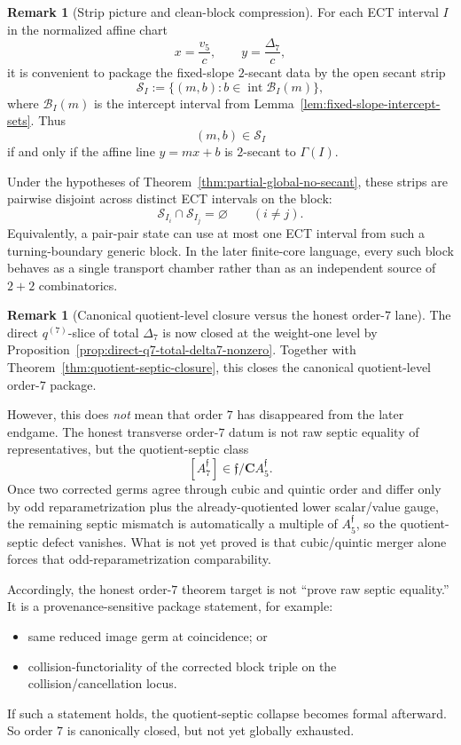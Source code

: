\documentclass[11pt,a4paper]{amsart}
\theoremstyle{plain}
\theoremstyle{definition}
\newtheorem{remark}[theorem]{Remark}
\begin{document}
\begin{remark}[Strip picture and clean-block compression]
\label{rem:strip-picture-clean-block-compression}
For each ECT interval $I$ in the normalized affine chart
\[
x=\frac{v_5}{c},
\qquad
y=\frac{\Delta_7}{c},
\]
it is convenient to package the fixed-slope $2$-secant data by the open
secant strip
\[
\mathcal S_I
:=
\{(m,b): b\in \operatorname{int}\mathcal B_I(m)\},
\]
where $\mathcal B_I(m)$ is the intercept interval from
Lemma~\ref{lem:fixed-slope-intercept-sets}. Thus
\[
(m,b)\in \mathcal S_I
\]
if and only if the affine line $y=mx+b$ is $2$-secant to $\Gamma(I)$.

Under the hypotheses of
Theorem~\ref{thm:partial-global-no-secant}, these strips are pairwise disjoint
across distinct ECT intervals on the block:
\[
\mathcal S_{I_i}\cap \mathcal S_{I_j}=\varnothing
\qquad(i\neq j).
\]
Equivalently, a pair-pair state can use at most one ECT interval from such a
turning-boundary generic block. In the later finite-core language, every such
block behaves as a single transport chamber rather than as an independent
source of $2+2$ combinatorics.
\end{remark}

\begin{remark}[Canonical quotient-level closure versus the honest order-$7$ lane]
\label{rem:status-direct-septic-witness}
The direct $q^{(7)}$-slice of total $\Delta_7$ is now closed at the
weight-one level by
Proposition~\ref{prop:direct-q7-total-delta7-nonzero}. Together with
Theorem~\ref{thm:quotient-septic-closure}, this closes the canonical
quotient-level order-$7$ package.

However, this does \emph{not} mean that order $7$ has disappeared from the
later endgame. The honest transverse order-$7$ datum is not raw septic
equality of representatives, but the quotient-septic class
\[
[A_7^{\mathfrak f}]\in \mathfrak f/\mathbf C A_5^{\mathfrak f}.
\]
Once two corrected germs agree through cubic and quintic order and differ only
by odd reparametrization plus the already-quotiented lower scalar/value gauge,
the remaining septic mismatch is automatically a multiple of
$A_5^{\mathfrak f}$, so the quotient-septic defect vanishes. What is not yet
proved is that cubic/quintic merger alone forces that odd-reparametrization
comparability.

Accordingly, the honest order-$7$ theorem target is not ``prove raw septic
equality.'' It is a provenance-sensitive package statement, for example:
\begin{itemize}
\item same reduced image germ at coincidence; or
\item collision-functoriality of the corrected block triple on the
collision/cancellation locus.
\end{itemize}
If such a statement holds, the quotient-septic collapse becomes formal
afterward. So order $7$ is canonically closed, but not yet globally exhausted.
\end{remark}
\end{document}
